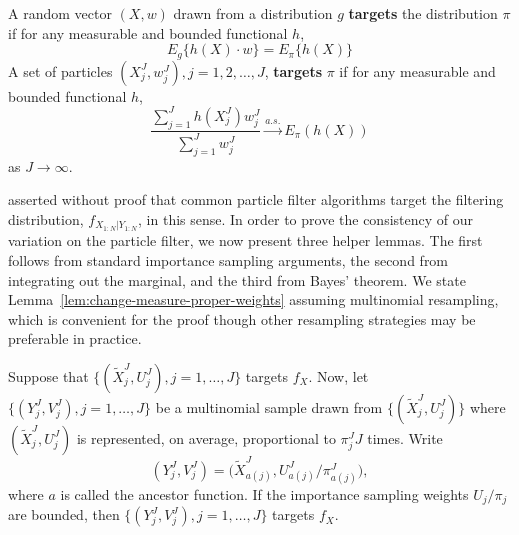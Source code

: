 

\begin{defn}[Targeting]
    A random vector $(X, w)$ drawn from a distribution $g$ \textbf{targets} the distribution $\pi$ if for any measurable and bounded functional $h$,
\begin{equation}
    E_g\{h(X) \cdot w\}=E_\pi\{h(X)\}
\end{equation}  
    A set of particles $(X^J_j, w^J_j), j=1,2, \ldots,J$, \textbf{targets} $\pi$ if for any measurable and bounded functional $h$,
\begin{equation}
    \frac{\sum_{j=1}^J h(X^J_j) w^J_j}{\sum_{j=1}^J w^J_j} \stackrel{a.s.}{\to} E_\pi(h(X))
\end{equation}
as $J \to \infty$.
\end{defn}
\cite{chopin04} asserted without proof that common particle filter algorithms target the filtering distribution, $f_{X_{1:N}|Y_{1:N}}$, in this sense.
In order to prove the consistency of our variation on the particle filter, we now present three helper lemmas.
The first follows from standard importance sampling arguments, the second from integrating out the marginal, and the third from Bayes' theorem. 
We state Lemma~\ref{lem:change-measure-proper-weights} assuming multinomial resampling, which is convenient for the proof though other resampling strategies may be preferable in practice.

\begin{lem}
    \label{lem:change-measure-proper-weights}
    Suppose that $\{(\tilde X_j^J,U_j^J),j=1,\dots,J\}$ targets $f_X$. Now, let $\{(Y_j^J,V_j^J),j=1,\dots,J\}$ be a multinomial sample drawn from $\{(\tilde X_j^J,U_j^J)\}$ where $(\tilde X_j^J,U_j^J)$ is represented, on average, proportional to $\pi^J_j J$ times. Write
    \[
    (Y_j^J,V_j^J) = \big(\tilde X^J_{a(j)},U^J_{a(j)}/\pi^J_{a(j)}\big),
    \]
    where $a$ is called the ancestor function. If the importance sampling weights $U_j/\pi_j$ are bounded, then $\{(Y^J_j,V^J_j),j=1,\dots,J\}$ targets $f_X$.
\end{lem}


